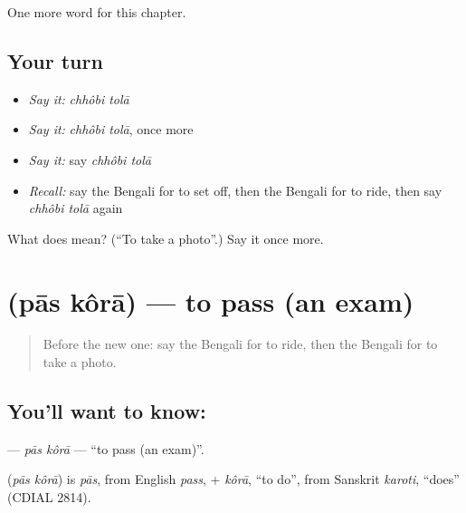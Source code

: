 \begin{grammarlens}[title={What you've built}]
One more word for this chapter.
\end{grammarlens}

\subsection*{Your turn}
\begin{itemize}
\raggedright
  \item \emph{Say it:} \emph{chhôbi tolā}
  \item \emph{Say it:} \emph{chhôbi tolā}, once more
  \item \emph{Say it:} say \emph{chhôbi tolā}
  \item \emph{Recall:} say the Bengali for to set off, then the Bengali for to ride, then say \emph{chhôbi tolā} again
\end{itemize}

\begin{tcolorbox}[breakable,colback=teal!4,colframe=teal!35!black,title={Before you move on}]
What does   mean? (\textquotedblleft{}To take a photo\textquotedblright{}.) Say it once more.
\end{tcolorbox}
\section[\texorpdfstring{\bn{পাস} \bn{করা} (pās kôrā)}{পাস করা (pās kôrā)}]{  (pās kôrā) — to pass (an exam)}

\label{lesson:BN-C214-pas-kora}



\begin{quote}
Before the new one: say the Bengali for to ride, then the Bengali for to take a photo.
\end{quote}

\subsection*{You'll want to know:  }
\textbf{ } — \emph{pās kôrā} — \textquotedblleft{}to pass (an exam)\textquotedblright{}.

\begin{cousinweb}
\textbf{ } (\emph{pās kôrā}) is \emph{pās}, from English \emph{pass}, + \emph{kôrā}, \textquotedblleft{}to do\textquotedblright{}, from Sanskrit \emph{karoti}, \textquotedblleft{}does\textquotedblright{} (CDIAL 2814).
\end{cousinweb}

